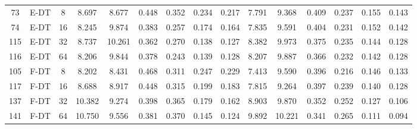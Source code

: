 \begin{table}
\begin{tabular}{@{\hskip3pt}c@{\hskip3pt}c@{\hskip3pt}c@{\hskip3pt}c@{\hskip3pt}c@{\hskip3pt}c@{\hskip3pt}c@{\hskip3pt}c@{\hskip3pt}c@{\hskip3pt}c@{\hskip3pt}c@{\hskip3pt}c@{\hskip3pt}c@{\hskip3pt}c@{\hskip3pt}c}
         73 &           E-DT &                   8 &             8.697 &       8.677 &         0.448 &       0.352 &       0.234 &        0.217 &               7.791 &       9.368 &         0.409 &       0.237 &       0.155 &        0.143 \\
         74 &           E-DT &                  16 &             8.245 &       9.874 &         0.383 &       0.257 &       0.174 &        0.164 &               7.835 &       9.591 &         0.404 &       0.231 &       0.152 &        0.142 \\
        115 &           E-DT &                  32 &             8.737 &      10.261 &         0.362 &       0.270 &       0.138 &        0.127 &               8.382 &       9.973 &         0.375 &       0.235 &       0.144 &        0.128 \\
        116 &           E-DT &                  64 &             8.206 &       9.844 &         0.378 &       0.243 &       0.139 &        0.128 &               8.207 &       9.887 &         0.366 &       0.232 &       0.142 &        0.128 \\
        105 &           F-DT &                   8 &             8.202 &       8.431 &         0.468 &       0.311 &       0.247 &        0.229 &               7.413 &       9.590 &         0.396 &       0.216 &       0.146 &        0.133 \\
        117 &           F-DT &                  16 &             8.688 &       8.917 &         0.448 &       0.315 &       0.199 &        0.183 &               7.815 &       9.264 &         0.397 &       0.239 &       0.140 &        0.128 \\
        137 &           F-DT &                  32 &            10.382 &       9.274 &         0.398 &       0.365 &       0.179 &        0.162 &               8.903 &       9.870 &         0.352 &       0.252 &       0.127 &        0.106 \\
        141 &           F-DT &                  64 &            10.750 &       9.556 &         0.381 &       0.370 &       0.145 &        0.124 &               9.892 &      10.221 &         0.341 &       0.265 &       0.111 &        0.094 \\
\bottomrule
\end{tabular}
\end{table}
